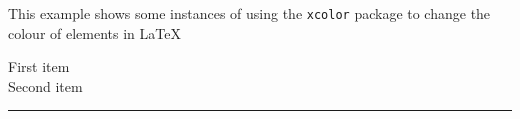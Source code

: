 \documentclass{article}
\begin{document}
This example shows some instances of using the \texttt{xcolor} package 
to change the colour of elements in \LaTeX %

\color{blue}
First item \\
Second item

\noindent %

{\color{red} \rule{\linewidth}{0.5mm}}
\end{document}
